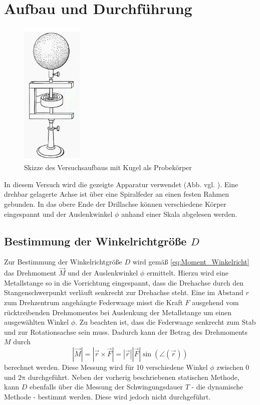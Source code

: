 \section{Aufbau und Durchführung} %
\label{sec:durchfhrung}
\begin{figure}[h]
	\label{fig:drillachse}
	\centering
	\includegraphics[height=7cm]{Bilder/drillachse}
	\caption{Skizze des Versuchsaufbaus mit Kugel als Probekörper}
\end{figure}
In diesem Versuch wird die gezeigte Apparatur verwendet (Abb. vgl. \cite{V101}). 
Eine drehbar gelagerte Achse ist über eine Spiralfeder an einen festen Rahmen gebunden. 
In das obere Ende der Drillachse können verschiedene Körper eingespannt und der Auslenkwinkel $\phi$ anhand einer Skala abgelesen werden.
\subsection{Bestimmung der Winkelrichtgröße $D$}
\label{subsec:winkelricht}
Zur Bestimmung der Winkelrichtgröße $D$ wird gemäß \eqref{eq:Moment_Winkelricht} das Drehmoment $\vec{M}$ und der Auslenkwinkel $\phi$ ermittelt. Hierzu wird eine Metallstange so in die Vorrichtung eingespannt, 
dass die Drehachse durch den Stangenschwerpunkt verläuft senkrecht zur Drehachse steht.
Eine im Abstand $r$ zum Drehzentrum angehängte Federwaage misst die Kraft $F$ ausgehend vom rücktreibenden Drehmomentes bei Auslenkung der Metallstange um einen ausgewählten Winkel $\phi$. 
Zu beachten ist, dass die Federwaage senkrecht zum Stab und zur Rotationsachse sein muss. 
Dadurch kann der Betrag des Drehmoments $M$ durch
\begin{equation}
	| \vec{M} | = | \vec{r} \times \vec{F} | = |\vec{r}| |\vec{F}| \sin (\angle({\vec{r}}))
\end{equation}
berechnet werden.
Diese Messung wird für 10 verschiedene Winkel $\phi$ zwischen 0 und $2\mathup{\pi}$ durchgeführt. Neben der vorherig beschriebenen statischen Methode, kann $D$ ebenfalls über die Messung der Schwingungsdauer $T$ - die dynamische Methode - bestimmt werden. Diese wird jedoch nicht durchgeführt.

